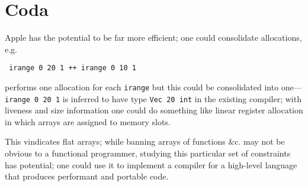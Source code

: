 \documentclass[sigplan,screen,anonymous]{acmart}
\begin{document}
\section{Coda}

Apple has the potential to be far more efficient; one could consolidate allocations, e.g.

\begin{verbatim}
 irange 0 20 1 ++ irange 0 10 1
\end{verbatim}
performs one allocation for each {\tt irange} but this could be consolidated into one---{\tt irange 0 20 1} is inferred to have type {\tt Vec 20 int} in the existing compiler; with liveness and size information one could do something like linear register allocation in which arrays are assigned to memory slots. %

This vindicates flat arrays; while banning arrays of functions \&c. may not be obvious to a functional programmer, studying this particular set of constraints has potential; one could use it to implement a compiler for a high-level language that produces performant and portable code.



\end{document}
